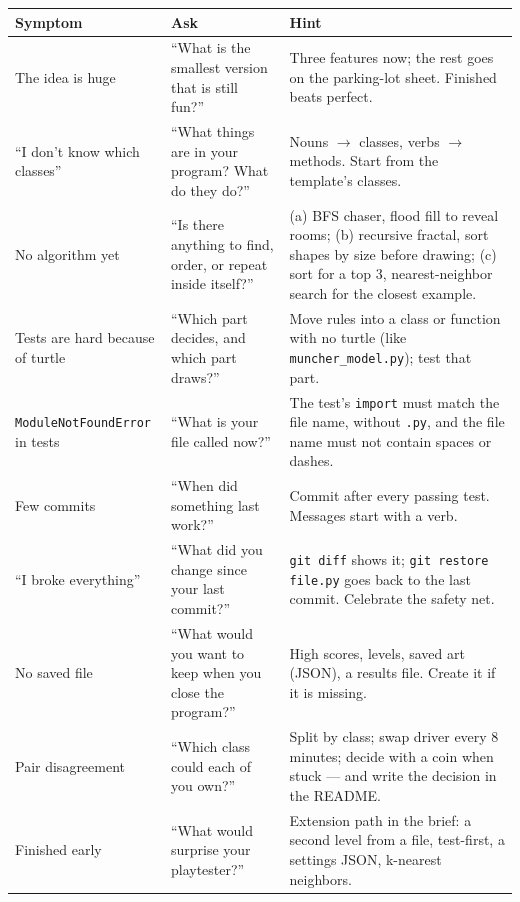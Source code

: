 \documentclass[level=3,teacher]{kidscode}
\begin{document}
\begin{longtable}{@{}>{\raggedright\arraybackslash}p{3.6cm}>{\raggedright\arraybackslash}p{4.6cm}>{\raggedright\arraybackslash}p{\dimexpr\linewidth-8.2cm-4\tabcolsep}@{}}
\toprule
\rowcolor{kcaccent!15} Symptom & Ask & Hint\\ \midrule\endhead
\bottomrule\endfoot
The idea is huge & \enquote{What is the smallest version that is still fun?} & Three features now; the
rest goes on the parking-lot sheet. Finished beats perfect.\\ \midrule
\enquote{I don't know which classes} & \enquote{What things are in your program? What do they do?} &
Nouns $\rightarrow$ classes, verbs $\rightarrow$ methods. Start from the template's classes.\\ \midrule
No algorithm yet & \enquote{Is there anything to find, order, or repeat inside itself?} &
(a) BFS chaser, flood fill to reveal rooms; (b) recursive fractal, sort shapes by size before
drawing; (c) sort for a top 3, nearest-neighbor search for the closest example.\\ \midrule
Tests are hard because of turtle & \enquote{Which part decides, and which part draws?} & Move rules into a
class or function with no turtle (like \texttt{muncher\_model.py}); test that part.\\ \midrule
\texttt{ModuleNotFoundError} in tests & \enquote{What is your file called now?} & The test's
\texttt{import} must match the file name, without \texttt{.py}, and the file name must not contain
spaces or dashes.\\ \midrule
Few commits & \enquote{When did something last work?} & Commit after every passing test. Messages
start with a verb.\\ \midrule
\enquote{I broke everything} & \enquote{What did you change since your last commit?} & \texttt{git diff}
shows it; \texttt{git restore file.py} goes back to the last commit. Celebrate the safety net.\\ \midrule
No saved file & \enquote{What would you want to keep when you close the program?} & High scores,
levels, saved art (JSON), a results file. Create it if it is missing.\\ \midrule
Pair disagreement & \enquote{Which class could each of you own?} & Split by class; swap driver every 8
minutes; decide with a coin when stuck --- and write the decision in the README.\\ \midrule
Finished early & \enquote{What would surprise your playtester?} & Extension path in the brief: a
second level from a file, test-first, a settings JSON, k-nearest neighbors.\\
\end{longtable}
\end{document}
